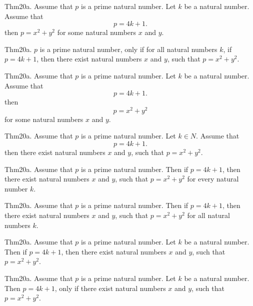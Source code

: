 \documentclass{article}
\begin{document}
Thm20a. Assume that $p$ is a prime natural number. Let $k$ be a natural number. Assume that $$p = 4 k + 1.$$ then $p = x ^{ 2}+ y ^{ 2}$ for some natural numbers $x$ and $y$.

Thm20a. $p$ is a prime natural number, only if for all natural numbers $k$, if $p = 4 k + 1$, then there exist natural numbers $x$ and $y$, such that $p = x ^{ 2}+ y ^{ 2}$.

Thm20a. Assume that $p$ is a prime natural number. Let $k$ be a natural number. Assume that $$p = 4 k + 1.$$ then $$p = x ^{ 2}+ y ^{ 2}$$ for some natural numbers $x$ and $y$.

Thm20a. Assume that $p$ is a prime natural number. Let $k \in N$. Assume that $$p = 4 k + 1.$$ then there exist natural numbers $x$ and $y$, such that $p = x ^{ 2}+ y ^{ 2}$.

Thm20a. Assume that $p$ is a prime natural number. Then if $p = 4 k + 1$, then there exist natural numbers $x$ and $y$, such that $p = x ^{ 2}+ y ^{ 2}$ for every natural number $k$.

Thm20a. Assume that $p$ is a prime natural number. Then if $p = 4 k + 1$, then there exist natural numbers $x$ and $y$, such that $p = x ^{ 2}+ y ^{ 2}$ for all natural numbers $k$.

Thm20a. Assume that $p$ is a prime natural number. Let $k$ be a natural number. Then if $p = 4 k + 1$, then there exist natural numbers $x$ and $y$, such that $p = x ^{ 2}+ y ^{ 2}$.

Thm20a. Assume that $p$ is a prime natural number. Let $k$ be a natural number. Then $p = 4 k + 1$, only if there exist natural numbers $x$ and $y$, such that $p = x ^{ 2}+ y ^{ 2}$.
\end{document}
